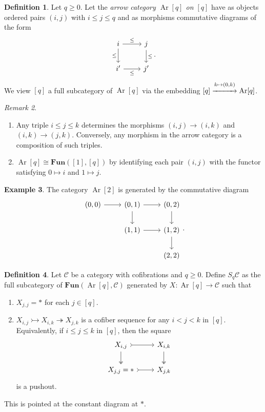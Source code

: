 \documentclass[10pt,letterpaper,cm]{nupset}
\theoremstyle{definition}
\newtheorem{definition}{Definition}
\newtheorem{exmp}[definition]{Example}
\theoremstyle{theorem}
\theoremstyle{remark}
\newtheorem{remark}[definition]{Remark}
\newcommand{\1}{\mathbf{1}}
\renewcommand{\c}{\mathscr{C}}
\newcommand{\0}{\vec 0}
\DeclareMathOperator{\Ar}{Ar}
\begin{document}
\begin{definition}
Let $q\geq 0$. Let the \textit{arrow category $\Ar[q]$ on $[q]$} have as objects ordered pairs $(i, j)$ with $i\leq j \leq q$ and as morphisms commutative diagrams of the form
\[
\begin{tikzcd}
i \arrow[d, "\leq"'] \arrow[r, "\leq"] & j \arrow[d, "\leq"] \\
i' \arrow[r, "\leq"'] & j'
\end{tikzcd}.
\] We view $[q]$ a full subcategory of $\Ar[q]$ via the embedding $[q] \overset{k \mapsto (0, k)}{\xrightarrow{\hspace*{1cm}}} \Ar[q]$.
\end{definition}

\begin{remark} $ $
\begin{enumerate}
\item Any triple $i\leq j \leq k$ determines the morphisms $(i, j) \to (i, k)$ and $(i, k) \to (j, k)$. Conversely, any morphism in the arrow category is a composition of such triples.
\item $\Ar[q] \cong \mathbf{Fun}([1], [q])$ by identifying each pair $(i, j)$ with the functor satisfying $0 \mapsto i$ and $1 \mapsto j$.
\end{enumerate}
\end{remark}

\begin{exmp}
The category $\Ar[2]$ is generated by the commutative diagram
\[
\begin{tikzcd}
{(0, 0)} \arrow[r] & {(0,1)} \arrow[r] \arrow[d] & {(0,2)} \arrow[d] \\
 & {(1, 1)} \arrow[r] & {(1,2)} \arrow[d] \\
 &  & {(2,2)}
\end{tikzcd} .
\]
\end{exmp}

\begin{definition}
Let $\c$ be a category with cofibrations and $q\geq 0$. Define $S_q\c$ as the full subcategory of $\mathbf{Fun}(\Ar[q], \c)$ generated by $X: \Ar[q] \to \c$ such that
\begin{enumerate}
\item $X_{j, j} = \ast$ for each $j \in [q]$.
\item $X_{i, j} \rightarrowtail X_{i, k} \twoheadrightarrow X_{j, k}$ is a cofiber sequence for any $i < j < k$ in $[q]$. Equivalently, if $i\leq j\leq k$ in $[q]$, then the square
\[
\begin{tikzcd}
{X_{i,j}} \arrow[d, two heads] \arrow[r, tail] & {X_{i,k}} \arrow[d, two heads] \\
{X_{j,j}=\ast} \arrow[r, tail] & {X_{j,k}}
\end{tikzcd}
\]
is a pushout. 
\end{enumerate}
This is pointed at the constant diagram at $\ast$.
\end{definition}
\end{document}
